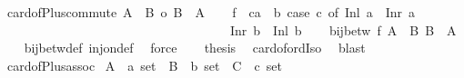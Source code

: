 \begin{isabellebody}
\isanewline
{}\isamarkupfalse%
\ card{\isacharunderscore}{\kern0pt}of{\isacharunderscore}{\kern0pt}Plus{\isacharunderscore}{\kern0pt}commute{\isacharcolon}{\kern0pt}\ {\isachardoublequoteopen}{\isacharbar}{\kern0pt}A\ {\isacharless}{\kern0pt}{\isacharplus}{\kern0pt}{\isachargreater}{\kern0pt}\ B{\isacharbar}{\kern0pt}\ {\isacharequal}{\kern0pt}o\ {\isacharbar}{\kern0pt}B\ {\isacharless}{\kern0pt}{\isacharplus}{\kern0pt}{\isachargreater}{\kern0pt}\ A{\isacharbar}{\kern0pt}{\isachardoublequoteclose}\isanewline
%
\isadelimproof
%
\endisadelimproof
%
\isatagproof
{}\isamarkupfalse%
{\isacharminus}{\kern0pt}\isanewline
\ \ \isamarkupfalse%
\ {\isacharquery}{\kern0pt}f\ {\isacharequal}{\kern0pt}\ {\isachardoublequoteopen}{\isasymlambda}{\isacharparenleft}{\kern0pt}c{\isacharcolon}{\kern0pt}{\isacharcolon}{\kern0pt}{\isacharprime}{\kern0pt}a\ {\isacharplus}{\kern0pt}\ {\isacharprime}{\kern0pt}b{\isacharparenright}{\kern0pt}{\isachardot}{\kern0pt}\ case\ c\ of\ Inl\ a\ {\isasymRightarrow}\ Inr\ a\isanewline
\ \ \ \ \ \ \ \ \ \ \ \ \ \ \ \ \ \ \ \ \ \ \ \ \ \ \ \ \ \ \ \ \ \ \ {\isacharbar}{\kern0pt}\ Inr\ b\ {\isasymRightarrow}\ Inl\ b{\isachardoublequoteclose}\isanewline
\ \ \isamarkupfalse%
\ {\isachardoublequoteopen}bij{\isacharunderscore}{\kern0pt}betw\ {\isacharquery}{\kern0pt}f\ {\isacharparenleft}{\kern0pt}A\ {\isacharless}{\kern0pt}{\isacharplus}{\kern0pt}{\isachargreater}{\kern0pt}\ B{\isacharparenright}{\kern0pt}\ {\isacharparenleft}{\kern0pt}B\ {\isacharless}{\kern0pt}{\isacharplus}{\kern0pt}{\isachargreater}{\kern0pt}\ A{\isacharparenright}{\kern0pt}{\isachardoublequoteclose}\isanewline
\ \ \isamarkupfalse%
\ bij{\isacharunderscore}{\kern0pt}betw{\isacharunderscore}{\kern0pt}def\ inj{\isacharunderscore}{\kern0pt}on{\isacharunderscore}{\kern0pt}def\ \isamarkupfalse%
\ force\isanewline
\ \ \isamarkupfalse%
\ {\isacharquery}{\kern0pt}thesis\ \isamarkupfalse%
\ card{\isacharunderscore}{\kern0pt}of{\isacharunderscore}{\kern0pt}ordIso\ \isamarkupfalse%
\ blast\isanewline
{}\isamarkupfalse%
%
\endisatagproof
{\isafoldproof}%
%
\isadelimproof
\isanewline
%
\endisadelimproof
\isanewline
{}\isamarkupfalse%
\ card{\isacharunderscore}{\kern0pt}of{\isacharunderscore}{\kern0pt}Plus{\isacharunderscore}{\kern0pt}assoc{\isacharcolon}{\kern0pt}\isanewline
{}\ A\ {\isacharcolon}{\kern0pt}{\isacharcolon}{\kern0pt}\ {\isachardoublequoteopen}{\isacharprime}{\kern0pt}a\ set{\isachardoublequoteclose}\ \ B\ {\isacharcolon}{\kern0pt}{\isacharcolon}{\kern0pt}\ {\isachardoublequoteopen}{\isacharprime}{\kern0pt}b\ set{\isachardoublequoteclose}\ \ C\ {\isacharcolon}{\kern0pt}{\isacharcolon}{\kern0pt}\ {\isachardoublequoteopen}{\isacharprime}{\kern0pt}c\ set{\isachardoublequoteclose}\isanewline

\end{isabellebody}
